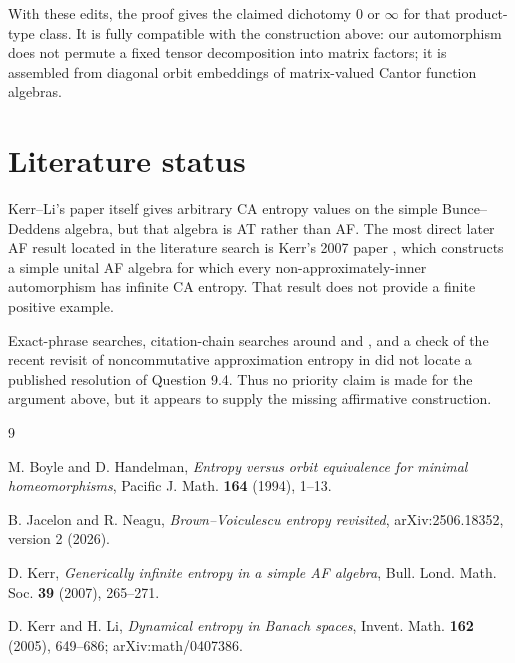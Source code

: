 \documentclass[11pt]{article}
\theoremstyle{remark}
\begin{document}
With these edits, the proof gives the claimed dichotomy $0$ or $\infty$ for
that product-type class.  It is fully compatible with the construction
above: our automorphism does not permute a fixed tensor decomposition into
matrix factors; it is assembled from diagonal orbit embeddings of
matrix-valued Cantor function algebras.

\section{Literature status}

Kerr--Li's paper itself gives arbitrary CA entropy values on the simple
Bunce--Deddens algebra, but that algebra is AT rather than AF.  The most
direct later AF result located in the literature search is Kerr's 2007
paper \cite{KerrAF}, which constructs a simple unital AF algebra for which
every non-approximately-inner automorphism has infinite CA entropy.  That
result does not provide a finite positive example.

Exact-phrase searches, citation-chain searches around \cite{KerrLi} and
\cite{KerrAF}, and a check of the recent revisit of noncommutative
approximation entropy in \cite{JacelonNeagu} did not locate a published
resolution of Question 9.4.  Thus no priority claim is made for the argument
above, but it appears to supply the missing affirmative construction.

\begin{thebibliography}{9}

M. Boyle and D. Handelman,
\emph{Entropy versus orbit equivalence for minimal homeomorphisms},
Pacific J. Math. \textbf{164} (1994), 1--13.

B. Jacelon and R. Neagu,
\emph{Brown--Voiculescu entropy revisited},
arXiv:2506.18352, version 2 (2026).

D. Kerr,
\emph{Generically infinite entropy in a simple AF algebra},
Bull. Lond. Math. Soc. \textbf{39} (2007), 265--271.

D. Kerr and H. Li,
\emph{Dynamical entropy in Banach spaces},
Invent. Math. \textbf{162} (2005), 649--686;
arXiv:math/0407386.

\end{thebibliography}
\end{document}
